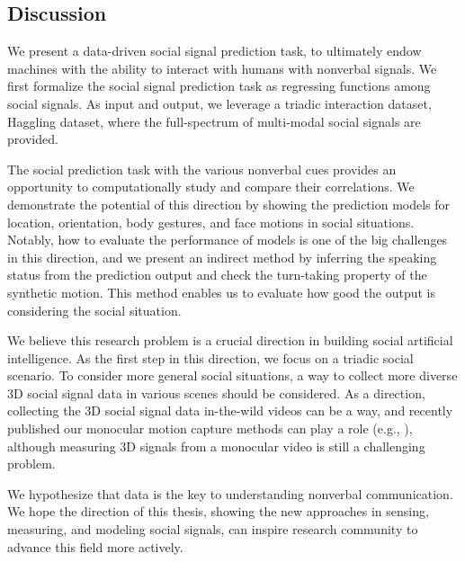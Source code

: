 





\subsection{Discussion}
We present a data-driven social signal prediction task, to ultimately endow machines with the ability to interact with humans with nonverbal signals. We first formalize the social signal prediction task as regressing functions among social signals. As input and output, we leverage a triadic interaction dataset, Haggling dataset, where the full-spectrum of multi-modal social signals are provided.

The social prediction task with the various nonverbal cues provides an opportunity to computationally study and compare their correlations. We demonstrate the potential of this direction by showing the prediction models for location, orientation, body gestures, and face motions in social situations. Notably, how to evaluate the performance of models is one of the big challenges in this direction, and we present an indirect method by inferring the speaking status from the prediction output and check the turn-taking property of the synthetic motion. This method enables us to evaluate how good the output is considering the social situation. 

We believe this research problem is a crucial direction in building social artificial intelligence. As the first step in this direction, we focus on a triadic social scenario. To consider more general social situations, a way to collect more diverse 3D social signal data in various scenes should be considered. As a direction, collecting the 3D social signal data in-the-wild videos can be a way, and recently published our monocular motion capture methods can play a role (e.g., \cite{Xiang2019}), although measuring 3D signals from a monocular video is still a challenging problem.

We hypothesize that data is the key to understanding nonverbal communication. We hope the direction of this thesis, showing the new approaches in sensing, measuring, and modeling social signals, can inspire research community to advance this field more actively. 